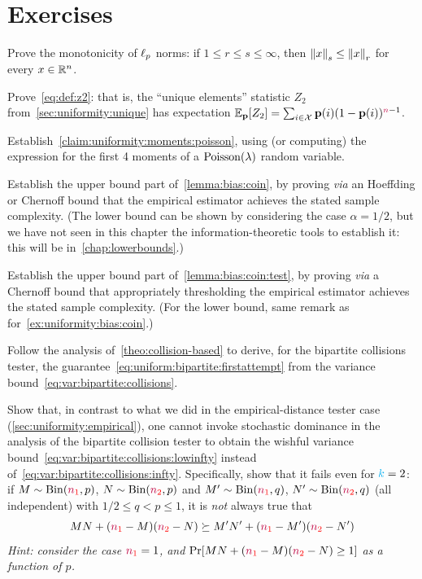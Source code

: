 \section{Exercises}
\begin{question}\label{ex:identity:monotonicity:lp}
  Prove the monotonicity of $\lp[p]$ norms: if $1\leq r\leq s \leq \infty$, then $\norm{x}_s \leq \norm{x}_r$ for every $x\in \R^n$.
\end{question}
\begin{question}\label{ex:expectation:z2} 
  Prove~\cref{eq:def:z2}: that is, the ``unique elements'' statistic $Z_2$ from~\cref{sec:uniformity:unique} has expectation $\bE{\p}{Z_2} = \sum_{i\in\domain} \p(i)(1-\p(i))^{\ns-1}$.
\end{question}
\begin{question}\label{ex:uniformity:moments:poisson}
  Establish~\cref{claim:uniformity:moments:poisson}, using (or computing) the expression for the first 4 moments of a $\poisson{\lambda}$ random variable.
\end{question}
\begin{question}\label{ex:uniformity:bias:coin}
  Establish the upper bound part of~\cref{lemma:bias:coin}, by proving \textit{via} an Hoeffding or Chernoff bound that the empirical estimator achieves the stated sample complexity. (The lower bound can be shown by considering the case $\alpha=1/2$, but we have not seen in this chapter the information-theoretic tools to establish it: this will be in~\cref{chap:lowerbounds}.)
\end{question}
\begin{question}\label{ex:uniformity:bias:coin:testing}
  Establish the upper bound part of~\cref{lemma:bias:coin:test}, by proving \textit{via} a Chernoff bound that appropriately thresholding the empirical estimator achieves the stated sample complexity. (For the lower bound, same remark as for~\cref{ex:uniformity:bias:coin}.)
\end{question}
\begin{question}\label{ex:uniformity:bipartite}
  Follow the analysis of~\cref{theo:collision-based} to derive, for the bipartite collisions tester, the guarantee~\cref{eq:uniform:bipartite:firstattempt} from the variance bound~\cref{eq:var:bipartite:collisions}.
\end{question}
\begin{question}\label{ex:nomallet}
  Show that, in contrast to what we did in the empirical-distance tester case (\cref{sec:uniformity:empirical}), one cannot invoke stochastic dominance in the analysis of the bipartite collision tester to obtain the wishful variance bound~\cref{eq:var:bipartite:collisions:lowinfty} instead of~\cref{eq:var:bipartite:collisions:infty}. Specifically, show that it fails even for $\ab=2$: if $M\sim\binomial{\nss}{p}$, $N\sim\binomial{\nst}{p}$ and $M'\sim\binomial{\nss}{q}$, $N'\sim\binomial{\nst}{q}$ (all independent) with $1/2\leq q < p \leq 1$, it is \emph{not} always true that
  \[
      MN+(\nss-M)(\nst-N) \succeq M'N'+(\nss-M')(\nst-N')
  \]
  \emph{Hint: consider the case $\nss=1$, and $\bPr{MN+(\nss-M)(\nst-N)\geq 1}$ as a function of $p$.}
\end{question}
